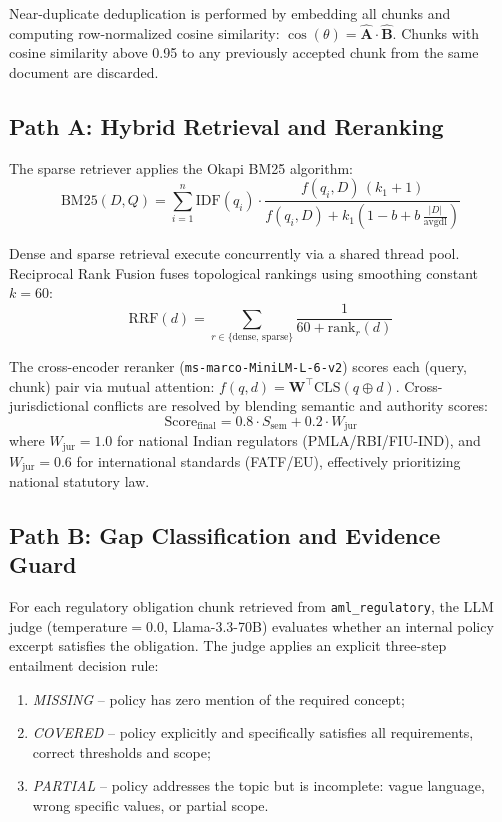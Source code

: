 \documentclass[conference, a4paper]{IEEEtran}
\begin{document}
Near-duplicate deduplication is performed by embedding all chunks and computing row-normalized
cosine similarity: $\cos(\theta) = \hat{\mathbf{A}} \cdot \hat{\mathbf{B}}$. Chunks with cosine
similarity above 0.95 to any previously accepted chunk from the same document are discarded.

\subsection{Path A: Hybrid Retrieval and Reranking}

The sparse retriever applies the Okapi BM25 algorithm:
\begin{equation}
\mathrm{BM25}(D,Q) = \sum_{i=1}^{n} \mathrm{IDF}(q_i) \cdot
\frac{f(q_i,D)\,(k_1+1)}{f(q_i,D) + k_1\!\left(1 - b + b\,\frac{|D|}{\mathrm{avgdl}}\right)}
\end{equation}

Dense and sparse retrieval execute concurrently via a shared thread pool. Reciprocal Rank Fusion
fuses topological rankings using smoothing constant $k{=}60$:
\begin{equation}
\mathrm{RRF}(d) = \sum_{r \in \{\mathrm{dense,\,sparse}\}} \frac{1}{60 + \mathrm{rank}_r(d)}
\end{equation}

The cross-encoder reranker (\texttt{ms-marco-MiniLM-L-6-v2}) scores each (query, chunk) pair via
mutual attention: $f(q,d) = \mathbf{W}^\top \mathrm{CLS}(q \oplus d)$. Cross-jurisdictional
conflicts are resolved by blending semantic and authority scores:
\begin{equation}
\mathrm{Score}_\mathrm{final} = 0.8 \cdot S_\mathrm{sem} + 0.2 \cdot W_\mathrm{jur}
\end{equation}
where $W_\mathrm{jur} = 1.0$ for national Indian regulators (PMLA/RBI/FIU-IND), and $W_\mathrm{jur}
= 0.6$ for international standards (FATF/EU), effectively prioritizing national statutory law.

\subsection{Path B: Gap Classification and Evidence Guard}

For each regulatory obligation chunk retrieved from \texttt{aml\_regulatory}, the LLM judge
(temperature$=0.0$, Llama-3.3-70B) evaluates whether an internal policy excerpt satisfies the
obligation. The judge applies an explicit three-step entailment decision rule:
\begin{enumerate}
    \item \textit{MISSING} -- policy has zero mention of the required concept;
    \item \textit{COVERED} -- policy explicitly and specifically satisfies all requirements,
          correct thresholds and scope;
    \item \textit{PARTIAL} -- policy addresses the topic but is incomplete: vague language,
          wrong specific values, or partial scope.
\end{enumerate}
\end{document}
